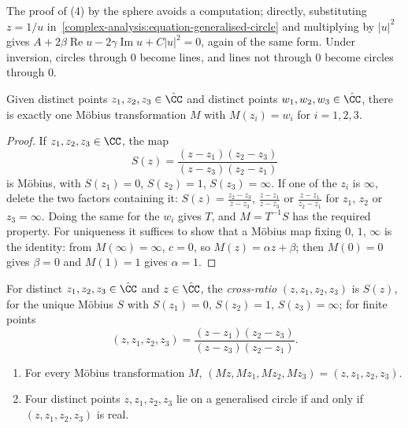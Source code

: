 The proof of (4) by the sphere avoids a computation; directly, substituting $z = 1/u$ in~\eqref{complex-analysis:equation-generalised-circle} and multiplying by $|u|^2$ gives
$A + 2\beta\operatorname{Re}u - 2\gamma\operatorname{Im}u + C|u|^2 = 0$, again of the same form. Under inversion, circles through $0$ become lines, and lines not through $0$ become circles through $0$.

\begin{theorem}\label{complex-analysis:theorem-three-points}
Given distinct points $z_1, z_2, z_3 \in \hat{\CC}$ and distinct points $w_1, w_2, w_3 \in \hat{\CC}$, there is exactly one M\"obius transformation $M$ with $M(z_i) = w_i$ for $i = 1, 2, 3$.
\end{theorem}

\begin{proof}
If $z_1, z_2, z_3 \in \CC$, the map
\[
S(z) = \frac{(z - z_1)(z_2 - z_3)}{(z - z_3)(z_2 - z_1)}
\]
is M\"obius, with $S(z_1) = 0$, $S(z_2) = 1$, $S(z_3) = \infty$. If one of the $z_i$ is $\infty$, delete the two factors containing it: $S(z) = \frac{z_2 - z_3}{z - z_3}$, $\frac{z - z_1}{z - z_3}$ or $\frac{z - z_1}{z_2 - z_1}$ for
$z_1$, $z_2$ or $z_3 = \infty$. Doing the same for the $w_i$ gives $T$, and $M = T^{-1}S$ has the required property. For uniqueness it suffices to show that a M\"obius map fixing $0$, $1$, $\infty$ is the identity: from
$M(\infty) = \infty$, $c = 0$, so $M(z) = \alpha z + \beta$; then $M(0) = 0$ gives $\beta = 0$ and $M(1) = 1$ gives $\alpha = 1$.
\end{proof}

\begin{definition}\label{complex-analysis:definition-cross-ratio}
For distinct $z_1, z_2, z_3 \in \hat{\CC}$ and $z \in \hat{\CC}$, the \emph{cross-ratio} $(z, z_1, z_2, z_3)$ is $S(z)$, for the unique M\"obius $S$ with $S(z_1) = 0$, $S(z_2) = 1$, $S(z_3) = \infty$; for finite points
\[
(z, z_1, z_2, z_3) = \frac{(z - z_1)(z_2 - z_3)}{(z - z_3)(z_2 - z_1)}.
\]
\end{definition}

\begin{corollary}\label{complex-analysis:corollary-cross-ratio}
\begin{enumerate}
\item For every M\"obius transformation $M$, $(Mz, Mz_1, Mz_2, Mz_3) = (z, z_1, z_2, z_3)$.
\item Four distinct points $z, z_1, z_2, z_3$ lie on a generalised circle if and only if $(z, z_1, z_2, z_3)$ is real.
\end{enumerate}
\end{corollary}

